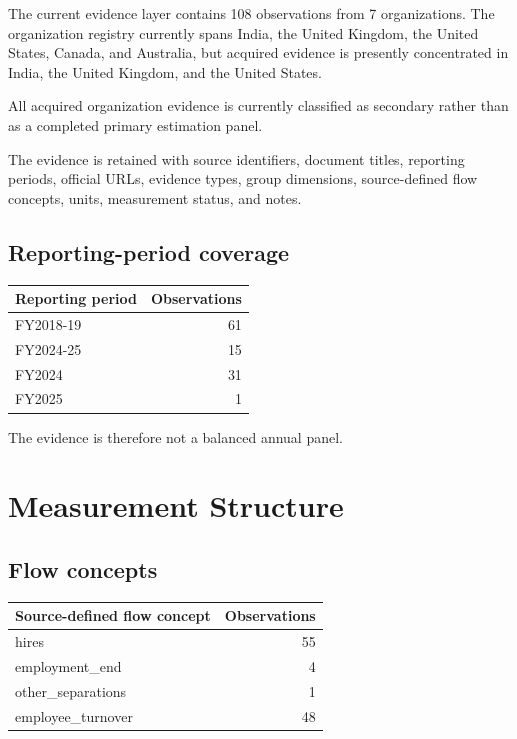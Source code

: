 \documentclass[a4paper,10pt]{article}
\begin{document}
The current evidence layer contains 108 observations from 7 organizations. The organization registry currently spans India, the United Kingdom, the United States, Canada, and Australia, but acquired evidence is presently concentrated in India, the United Kingdom, and the United States.

All acquired organization evidence is currently classified as secondary rather than as a completed primary estimation panel.

The evidence is retained with source identifiers, document titles, reporting periods, official URLs, evidence types, group dimensions, source-defined flow concepts, units, measurement status, and notes.

\subsection{Reporting-period coverage}

\begin{table}[H]
\centering
\begin{tabular}{lr}
\toprule
Reporting period & Observations \\
\midrule
FY2018-19 & 61 \\
FY2024-25 & 15 \\
FY2024 & 31 \\
FY2025 & 1 \\
\bottomrule
\end{tabular}
\end{table}

The evidence is therefore not a balanced annual panel.

\section{Measurement Structure}

\subsection{Flow concepts}

\begin{table}[H]
\centering
\begin{tabular}{lr}
\toprule
Source-defined flow concept & Observations \\
\midrule
hires & 55 \\
employment\_end & 4 \\
other\_separations & 1 \\
employee\_turnover & 48 \\
\bottomrule
\end{tabular}
\end{table}
\end{document}
